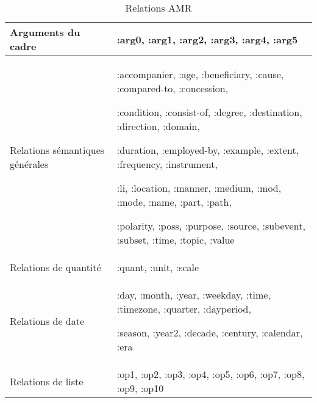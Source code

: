 \documentclass{KodeBook}
\begin{document}
\begin{table}[ht]
	\centering
	\begin{tabular}{>{\raggedright}p{}>{\raggedright\arraybackslash}p{}}
		\hline\hline
		Arguments du cadre  & 
		:arg0, :arg1, :arg2, :arg3, :arg4, :arg5 \\
		\hline
		Relations sémantiques générales &
		:accompanier, :age, :beneficiary, :cause, :compared-to, :concession, 
		
		:condition, :consist-of, :degree, :destination, :direction, :domain, 
		
		:duration, :employed-by, :example, :extent, :frequency, :instrument, 
		
		:li, :location, :manner, :medium, :mod, :mode, :name, :part, :path, 
		
		:polarity, :poss, :purpose, :source, :subevent, :subset, :time, :topic, :value \\
		\hline
		Relations de quantité &
		:quant, :unit, :scale \\
		\hline
		Relations de date &
		:day, :month,
		:year, :weekday, :time, :timezone, :quarter, :dayperiod, 
		
		:season, :year2, :decade, :century, :calendar, :era \\
		\hline
		Relations de liste & 
		:op1, :op2, :op3, :op4, :op5,
		:op6, :op7, :op8, :op9, :op10\\
		\hline\hline
	\end{tabular}
	\caption{Relations AMR}
	\label{tab:amr-rel}
\end{table}
\end{document}
